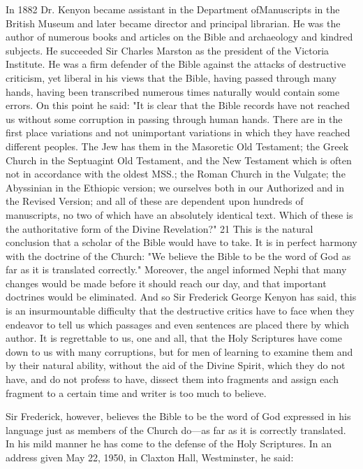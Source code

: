 In 1882 Dr. Kenyon became assistant in the Department of\linebreak Manuscripts in the British
Museum and later became director and principal librarian. He was the author of numerous
books and articles on the Bible and archaeology and kindred subjects. He succeeded Sir
Charles Marston as the president of the Victoria Institute. He was a firm defender of the
Bible against the attacks of destructive criticism, yet liberal in his views that the Bible,
having passed through many hands, having been transcribed numerous times naturally would
contain some errors. On this point he said: "It is clear that the Bible records have not reached
us without some corruption in passing through human hands. There are in the first place
variations and not unimportant variations in which they have reached different peoples. The
Jew has them in the Masoretic Old Testament; the Greek Church in the Septuagint Old
Testament, and the New Testament which is often not in accordance with the oldest MSS.;
the Roman Church in the Vulgate; the Abyssinian in the Ethiopic version; we ourselves both
in our Authorized and in the Revised Version; and all of these are dependent upon hundreds
of manuscripts, no two of which have an absolutely identical text. Which of these is the
authoritative form of the Divine Revelation?" 21 This is the natural conclusion that a scholar
of the Bible would have to take. It is in perfect harmony with the doctrine of the Church:
"We believe the Bible to be the word of God as far as it is translated correctly." Moreover,
the angel informed Nephi that many changes would be made before it should reach our day,
and that important doctrines would be eliminated. And so Sir Frederick George Kenyon has
said, this is an insurmountable difficulty that the destructive critics have to face when they
endeavor to tell us which passages and even sentences are placed there by which author. It is
regrettable to us, one and all, that the Holy Scriptures have come down to us with many
corruptions, but for men of learning to examine them and by their natural ability, without the
aid of the Divine Spirit, which they do not have, and do not profess to have, dissect them into
fragments and assign each fragment to a certain time and writer is too much to believe.

Sir Frederick, however, believes the Bible to be the word of God expressed in his language
just as members of the Church do—as far as it is correctly translated. In his mild manner he
has come to the defense of the Holy Scriptures. In an address given May 22, 1950, in Claxton
Hall, Westminster, he said:

